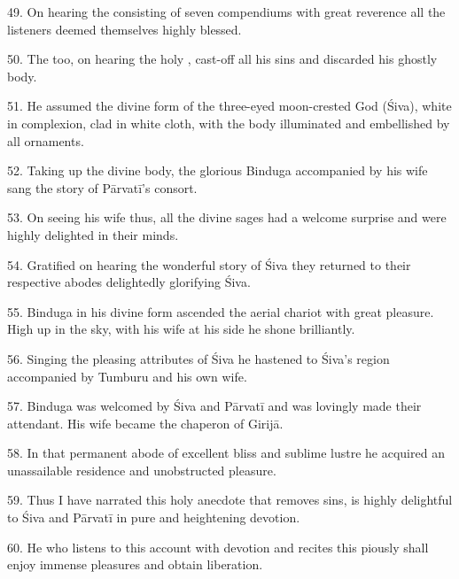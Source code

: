 49. On hearing the  consisting of seven compendiums with great
reverence all the listeners deemed themselves highly blessed.

50. The  too, on hearing the holy , cast-off all his
sins and discarded his ghostly body.

51. He assumed the divine form of the three-eyed moon-crested God (Śiva), white
in complexion, clad in white cloth, with the body illuminated and embellished by
all ornaments.

52. Taking up the divine body, the glorious Binduga accompanied by his wife sang
the story of Pārvatī’s consort.

53. On seeing his wife thus, all the divine sages had a welcome surprise and
were highly delighted in their minds.

54. Gratified on hearing the wonderful story of Śiva they returned to their
respective abodes delightedly glorifying Śiva.

55. Binduga in his divine form ascended the aerial chariot with great pleasure.
High up in the sky, with his wife at his side he shone brilliantly.

56. Singing the pleasing attributes of Śiva he hastened to Śiva’s region
accompanied by Tumburu and his own wife.

57. Binduga was welcomed by Śiva and Pārvatī and was lovingly made their
attendant. His wife became the chaperon of Girijā.

58. In that permanent abode of excellent bliss and sublime lustre he acquired an
unassailable residence and unobstructed pleasure.

59. Thus I have narrated this holy anecdote that removes sins, is highly
delightful to Śiva and Pārvatī in pure and heightening devotion.

60. He who listens to this account with devotion and recites this piously shall
enjoy immense pleasures and obtain liberation.
